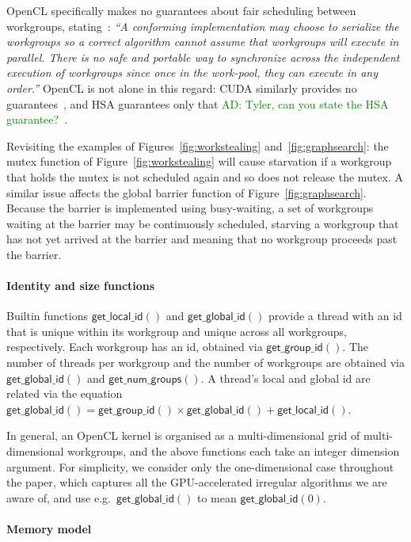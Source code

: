 \documentclass[nocopyrightspace]{sigplanconf-pldi16}
\newcommand{\ADComment}[1]{\textcolor{green}{AD: #1}}
\newcommand{\getgroupid}{\mathsf{get\_group\_id}}
\newcommand{\getnumgroups}{\mathsf{get\_num\_groups}}
\newcommand{\getlocalid}{\mathsf{get\_local\_id}}
\newcommand{\getglobalid}{\mathsf{get\_global\_id}}
\newcommand{\getlocalsize}{\mathsf{get\_global\_id}}
\begin{document}
OpenCL specifically makes no guarantees about fair scheduling between
workgroups, stating~\cite{...}: \emph{``A conforming implementation
  may choose to serialize the workgroups so a correct algorithm cannot
  assume that workgroups will execute in parallel.  There is no safe
  and portable way to synchronize across the independent execution of
  workgroups since once in the work-pool, they can execute in any
  order.''}  OpenCL is not alone in this regard: CUDA similarly
provides no guarantees~\cite{...}, and HSA guarantees only that
\ADComment{Tyler, can you state the HSA guarantee?}~\cite{...}.

Revisiting the examples of Figures~\ref{fig:workstealing}
and~\ref{fig:graphsearch}: the mutex function of
Figure~\ref{fig:workstealing} will cause starvation if a workgroup
that holds the mutex is not scheduled again and so does not release
the mutex.  A similar issue affects the global barrier function of
Figure~\ref{fig:graphsearch}.  Because the barrier is implemented
using busy-waiting, a set of workgroups waiting at the barrier may be
continuously scheduled, starving a workgroup that has not yet arrived
at the barrier and meaning that no workgroup proceeds past the
barrier.

\paragraph{Identity and size functions}

Builtin functions $\getlocalid()$ and $\getglobalid()$ provide a
thread with an id that is unique within its workgroup and unique
across all workgroups, respectively.  Each workgroup has an id,
obtained via $\getgroupid()$.  The number of threads per workgroup and
the number of workgroups are obtained via $\getlocalsize()$ and
$\getnumgroups()$.  A thread's local and global id are related via the
equation $\getglobalid() = \getgroupid() \times \getlocalsize() +
\getlocalid()$.

In general, an OpenCL kernel is organised as a multi-dimensional grid
of multi-dimensional workgroups, and the above functions each take
an integer dimension argument.  For simplicity, we consider only the
one-dimensional case throughout the paper, which captures all the
GPU-accelerated irregular algorithms we are aware of, and use
e.g.\ $\getglobalid()$ to mean $\getglobalid(0)$.


\paragraph{Memory model}
\end{document}
